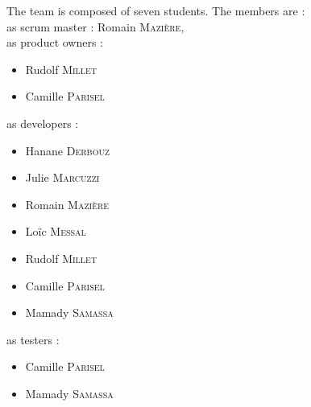 The team is composed of seven students. The members are :\\
as scrum master : Romain \textsc{Mazière}, \\
as product owners :
\begin{itemize}
	\item Rudolf \textsc{Millet}
	\item Camille \textsc{Parisel}
\end{itemize}
as developers :
\begin{itemize}
	\item Hanane \textsc{Derbouz}
	\item Julie \textsc{Marcuzzi}
	\item Romain \textsc{Mazière}
	\item Loïc \textsc{Messal}
	\item Rudolf \textsc{Millet}
	\item Camille \textsc{Parisel}
	\item Mamady \textsc{Samassa}
\end{itemize}
as testers :
\begin{itemize}
	\item Camille \textsc{Parisel}
	\item Mamady \textsc{Samassa}
\end{itemize}